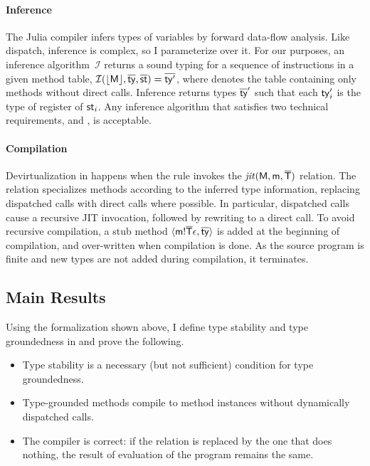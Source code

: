 \documentclass[oneside,openright,titlepage,numbers=noenddot,%
headinclude,footinclude,cleardoublepage=empty,abstract=on,
BCOR=5mm,paper=a4,fontsize=11pt,
dvipsnames
]{scrreprt}
\begin{document}
\paragraph{Inference}\label{sec:infer}

The Julia compiler infers types of variables by forward data-flow analysis. Like
dispatch, inference is complex, so I parameterize over it. For our purposes, an
inference algorithm~$\mathcal I$ returns a sound typing for a sequence of
instructions in a given method table,
$\operatorname{\mathcal{I}}(\lfloor \mathsf{M} \rfloor, \overline{\mathsf{ty}}, \overline{\mathsf{st}})=\overline{\mathsf{ty}'}$, where \origmtbl{\mtbl}
denotes the table containing only methods without direct calls. Inference
returns types $\overline{\mathsf{ty}}'$ such that each $\mathsf{ty}'_i$ is the type of register of
$\mathsf{st}_i$. Any inference algorithm that satisfies two technical requirements,  and
, is acceptable.

\paragraph{Compilation}\label{sec:comp}
%
Devirtualization in \jules happens when the  rule invokes the
$\operatorname{\mathit{jit}}(\mathsf{M},\mathsf{m},\overline{\mathsf{T}})$ relation. The relation specializes methods according to
the inferred type information, replacing
dispatched calls with direct calls where
possible. In particular, dispatched calls
cause a recursive JIT invocation, followed by rewriting to a direct call. To
avoid recursive compilation, a stub method $\langle \mathsf{m}!{\overline{\mathsf{T}}}\epsilon,
\overline{\mathsf{ty}} \rangle$ is added at the beginning of compilation,
and over-written when compilation is done. As the source program is finite and
new types are not added during compilation, it terminates.


\subsection{Main Results}%
\label{sec:stability-formal}\label{sec:jit-correct}

Using the formalization shown above, I define type stability and type
groundedness in \jules and prove the following.

\begin{itemize}
  \item
Type stability is a necessary (but not sufficient)
condition for type groundedness.

  \item
Type-grounded methods
compile to method instances without dynamically dispatched calls.

  \item
The compiler is correct: if the \jit relation is replaced by the one that
does nothing, the result of evaluation of the program remains the same.
\end{itemize}
\end{document}
